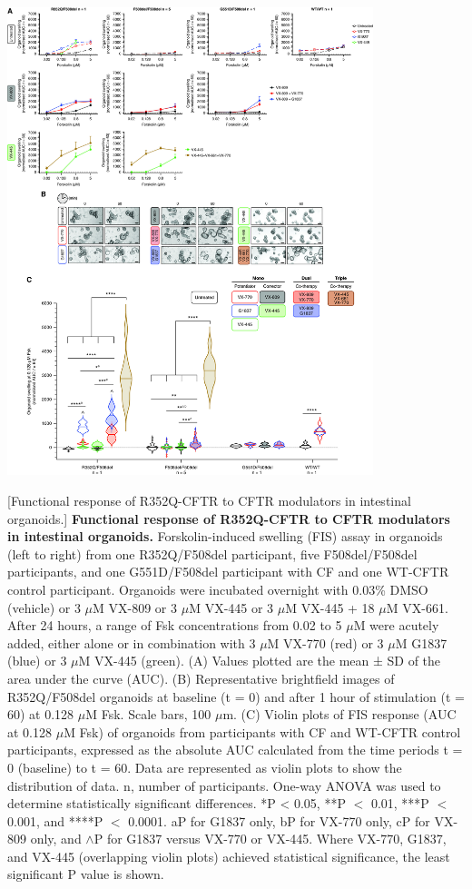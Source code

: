 \begin{center}
\includegraphics[width=0.80\textwidth]{figures/R352Q/figure_2.jpg}
\end{center}
\captionsetup{singlelinecheck = false, justification=raggedright}
\begingroup
{}[Functional response of R352Q-CFTR to CFTR modulators in intestinal organoids.] {\textbf{Functional response of R352Q-CFTR to CFTR modulators in intestinal organoids.}}{ Forskolin-induced swelling (FIS) assay in organoids (left to right) from one R352Q/F508del participant, five F508del/F508del participants, and one G551D/F508del participant with CF and one WT-CFTR control participant. Organoids were incubated overnight with 0.03\% DMSO (vehicle) or 3 $\mu$M VX-809 or 3 $\mu$M VX-445 or 3 $\mu$M VX-445 + 18 $\mu$M VX-661. After 24 hours, a range of Fsk concentrations from 0.02 to 5 $\mu$M were acutely added, either alone or in combination with 3 $\mu$M VX-770 (red) or 3 $\mu$M G1837 (blue) or 3 $\mu$M VX-445 (green). (A) Values plotted are the mean ± SD of the area under the curve (AUC). (B) Representative brightfield images of R352Q/F508del organoids at baseline (t = 0) and after 1 hour of stimulation (t = 60) at 0.128 $\mu$M Fsk. Scale bars, 100 $\mu$m. (C) Violin plots of FIS response (AUC at 0.128 $\mu$M Fsk) of organoids from participants with CF and WT-CFTR control participants, expressed as the absolute AUC calculated from the time periods t = 0 (baseline) to t = 60. Data are represented as violin plots to show the distribution of data. n, number of participants. One-way ANOVA was used to determine statistically significant differences. *P < 0.05, **P $<$ 0.01, ***P $<$ 0.001, and ****P $<$ 0.0001. aP for G1837 only, bP for VX-770 only, cP for VX-809 only, and $\wedge$P for G1837 versus VX-770 or VX-445. Where VX-770, G1837, and VX-445 (overlapping violin plots) achieved statistical significance, the least significant P value is shown.}
\label{R352Q_figure_2}
\endgroup


